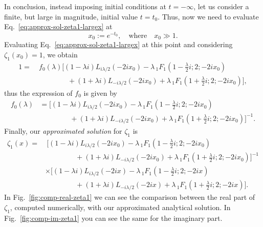 \documentclass[%
 aip,
 jmp,%
 amsmath,amssymb,
 reprint,%
]{revtex4-2}
\begin{document}
In conclusion, instead imposing initial conditions at $t = -\infty$, let us consider a finite, but large in magnitude, initial value $t = t_0$. Thus, now we need to evaluate Eq.~\eqref{eq:approx-sol-zeta1-largex} at
\begin{equation*}
    x_0 := e^{-t_0},\quad \text{where}\quad x_0 \gg 1.
\end{equation*}
Evaluating Eq.~\eqref{eq:approx-sol-zeta1-largex} at this point and considering $\zeta_1(x_0) = 1$, we obtain
\begin{equation}
\begin{aligned}
1 = &~{} f_0(\lambda) \Bigg[  (1-\lambda i)  L_{i \lambda/2}(-2 i x_0)  - \lambda \, _1F_1\left(1- \frac{\lambda}2 i ;2;-2 i x_0 \right) \\
&~{} \qquad\qquad +  (1+ \lambda i)L_{-i \lambda/2}(-2 i x_0) + \lambda \, _1F_1\left(1+  \frac{\lambda}2i ;2;-2 i x_0 \right)\Bigg],
\end{aligned}
\end{equation}
thus the expression of $f_0$ is given by
\begin{equation}
\begin{aligned}
    f_0(\lambda) &= \Bigg[  (1-\lambda i)  L_{i \lambda/2}(-2 i x_0)  - \lambda \, _1F_1\left(1- \frac{\lambda}2 i ;2;-2 i x_0 \right) \\
    &~{} \qquad\qquad +  (1+ \lambda i)L_{-i \lambda/2}(-2 i x_0) + \lambda \, _1F_1\left(1+  \frac{\lambda}2i ;2;-2 i x_0 \right)\Bigg]^{-1}.
\end{aligned}
\end{equation}
Finally, our \textit{approximated solution} for $\zeta_1$ is
\begin{equation}
\begin{aligned}
    \zeta_1(x)= &~{} \Bigg[  (1-\lambda i)  L_{i \lambda/2}(-2 i x_0)  - \lambda \, _1F_1\left(1- \frac{\lambda}2 i ;2;-2 i x_0 \right) \\
    &~{} \qquad\qquad +  (1+ \lambda i)L_{-i \lambda/2}(-2 i x_0) + \lambda \, _1F_1\left(1+  \frac{\lambda}2i ;2;-2 i x_0 \right)\Bigg]^{-1}\\
    &\times\Bigg[  (1-\lambda i)  L_{i \lambda/2}(-2 i x)  - \lambda \, _1F_1\left(1- \frac{\lambda}2 i ;2;-2 i x \right) \\
    &~{} \qquad\qquad +  (1+ \lambda i)L_{-i \lambda/2}(-2 i x) + \lambda \, _1F_1\left(1+  \frac{\lambda}2i ;2;-2 i x \right)\Bigg].
\end{aligned}
\end{equation}
In Fig.~\ref{fig:comp-real-zeta1} we can see the comparison between the real part of $\zeta_1$, computed numerically, with our approximated analytical solution. In Fig.~\ref{fig:comp-im-zeta1} you can see the same for the imaginary part.
\end{document}
